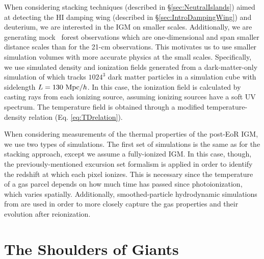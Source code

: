 When considering stacking techniques (described in \S \ref{sec:NeutralIslands}) aimed at detecting the HI damping wing (described in \S \ref{sec:IntroDampingWing}) and deuterium, we are interested in the IGM on smaller scales. Additionally, we are generating mock \lya\ forest observations which are one-dimensional and span smaller distance scales than for the 21-cm observations. This motivates us to use smaller simulation volumes with more accurate physics at the small scales. Specifically, we use simulated density and ionization fields generated from a dark-matter-only simulation of \cite{McQuinn:2007dy} which tracks $1024^{3}$ dark matter particles in a simulation cube with sidelength $L = 130\ \text{Mpc/$h$}$. In this case, the ionization field is calculated by casting rays from each ionizing source, assuming ionizing sources have a soft UV spectrum. The temperature field is obtained through a modified temperature-density relation (Eq. \ref{eq:TDrelation}).


When considering measurements of the thermal properties of the post-EoR IGM, we use two types of simulations. The first set of simulations is the same as for the stacking approach, except we assume a fully-ionized IGM. In this case, though, the previously-mentioned excursion set formalism is applied in order to identify the redshift at which each pixel ionizes. This is necessary since the temperature of a gas parcel depends on how much time has passed since photoionization, which varies spatially. Additionally, smoothed-particle hydrodynamic simulations from \cite{Lidz2010} are used in order to more closely capture the gas properties and their evolution after reionization. 

\section{The Shoulders of Giants} 

